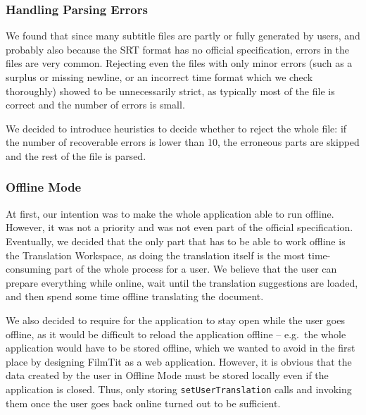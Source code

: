 {\subsubsection{Handling Parsing Errors}


We found that since many subtitle files are partly or fully generated by users, and probably also because the SRT format has no official specification, errors in the files are very common. Rejecting even the files with only minor errors (such as a surplus or missing newline, or an incorrect time format which we check thoroughly) showed to be unnecessarily strict, as typically most of the file is correct and the number of errors is small.

We decided to introduce heuristics to decide whether to reject the whole file: if the number of recoverable errors is lower than 10, the erroneous parts are skipped and the rest of the file is parsed.



\subsubsection{Offline Mode}
\label{ip:subsubsec:offline}

At first, our intention was to make the whole application able to run offline. However, it was not a priority and was not even part of the official specification.
Eventually, we decided that the only part that has to be able to work offline is the Translation Workspace, as doing the translation itself is the most time-consuming part of the whole process for a user. We believe that the user can prepare everything while online, wait until the translation suggestions are loaded, and then spend some time offline translating the document.

We also decided to require for the application to stay open while the user goes offline, as it would be difficult to reload the application offline
-- e.g.\ the whole application would have to be stored offline, which we wanted to avoid in the first place by designing FilmTit as a web application.
However, it is obvious that the data created by the user in Offline Mode must be stored locally even if the application is closed.
Thus, only storing {\tt setUserTranslation} calls and invoking them once the user goes back online turned out to be sufficient.

}
